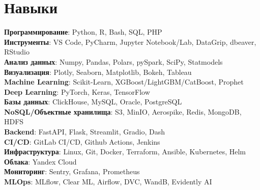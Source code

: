 \section{Навыки}
\begin{itemize}[leftmargin=0.15in, label={}]
  {\item{
        \textbf{Программирование}{: Python, R, Bash, SQL, PHP} \\
        \textbf{Инструменты}{: VS Code, PyCharm, Jupyter Notebook/Lab, DataGrip, dbeaver, RStudio} \\
        \textbf{Анализ данных}{: Numpy, Pandas, Polars, pySpark, SciPy, Statmodels} \\
        \textbf{Визуализация}{: Plotly, Seaborn, Matplotlib, Bokeh, Tableau} \\
        \textbf{Machine Learning}{: Scikit-Learn, XGBoost/LightGBM/CatBoost, Prophet} \\
        \textbf{Deep Learning}{: PyTorch, Keras, TensorFlow} \\
        \textbf{Базы данных}{: ClickHouse, MySQL, Oracle, PostgreSQL} \\
        \textbf{NoSQL/Объектные хранилища}{: S3, MinIO, Aerospike, Redis, MongoDB, HDFS} \\
        \textbf{Backend}{: FastAPI, Flask, Streamlit, Gradio, Dash} \\
        \textbf{CI/CD}{: GitLab CI/CD, Github Actions, Jenkins} \\
        \textbf{Инфраструктура}{: Linux, Git, Docker, Terraform, Ansible, Kubernetes, Helm} \\
        \textbf{Облака}{: Yandex Cloud} \\
        \textbf{Мониторинг}{: Sentry, Grafana, Prometheus} \\
        \textbf{MLOps}{: MLflow, Clear ML, Airflow, DVC, WandB, Evidently AI} \\
        }}
\end{itemize}
